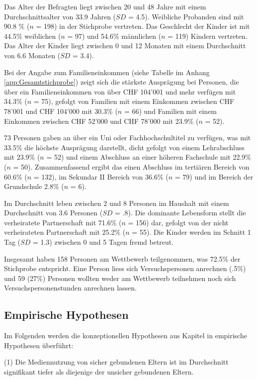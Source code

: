 Das Alter der Befragten liegt zwischen 20 und 48 Jahre mit einem Durchschnittsalter von 33.9 Jahren ($SD$ = 4.5). Weibliche Probanden sind mit 90.8 \% ($n$ = 198) in der Stichprobe vertreten. Das Geschlecht der Kinder ist mit 44.5\% weiblichen ($n$ = 97) und 54.6\% männlichen ($n$ = 119) Kindern vertreten. Das Alter der Kinder liegt zwischen 0 und 12 Monaten mit einem Durchschnitt von 6.6 Monaten ($SD$ = 3.4).

Bei der Angabe zum Familieneinkommen (siehe Tabelle  im Anhang \ref{app:Gesamtstichprobe}) zeigt sich die stärkste Ausprägung bei Personen, die über ein Familieneinkommen von über CHF 104'001 und mehr verfügen mit 34.3\% ($n$ = 75), gefolgt von Familien mit einem Einkommen zwischen CHF 78'001 und CHF 104'000 mit 30.3\% ($n$ = 66) und Familien mit einem Einkommen zwischen CHF 52'000 und CHF 78'000 mit 23.9\% ($n$ = 52). 

73 Personen gaben an über ein Uni oder Fachhochschultitel zu verfügen, was mit 33.5\% die höchste Ausprägung darstellt, dicht gefolgt von einem Lehrabschluss mit 23.9\% ($n$ = 52) und einem Abschluss an einer höheren Fachschule mit 22.9\% ($n$ = 50). Zusammenfassend ergibt das einen Abschluss im tertiären Bereich von 60.6\% ($n$ = 132), im Sekundar II Bereich von 36.6\% ($n$ = 79) und im Bereich der Grundschule 2.8\% ($n$ = 6).

Im Durchschnitt leben zwischen 2 und 8 Personen im Haushalt mit einem Durchschnitt von 3.6 Personen ($SD$ = .8). Die dominante Lebensform stellt die verheiratete Partnerschaft mit 71.6\% ($n$ = 156) dar, gefolgt von der nicht verheirateten Partnerschaft mit 25.2\% ($n$ = 55). Die Kinder werden im Schnitt 1 Tag ($SD$ = 1.3)  zwischen 0 und 5 Tagen fremd betreut.

Insgesamt haben 158 Personen am Wettbewerb teilgenommen, was 72.5\% der Stichprobe entspricht. Eine Person liess sich Versuchspersonen anrechnen (.5\%) und 59 (27\%) Personen wollten weder am Wettbewerb teilnehmen noch sich Versuchspersonenstunden anrechnen lassen.



\subsection{Empirische Hypothesen}\label{sec:EmpirischeHypothesen}
Im Folgenden werden die konzeptionellen Hypothesen aus Kapitel  in empirische Hypothesen überführt:

(1) Die Mediennutzung von sicher gebundenen Eltern ist im Durchschnitt signifikant tiefer als diejenige der unsicher gebundenen Eltern.

